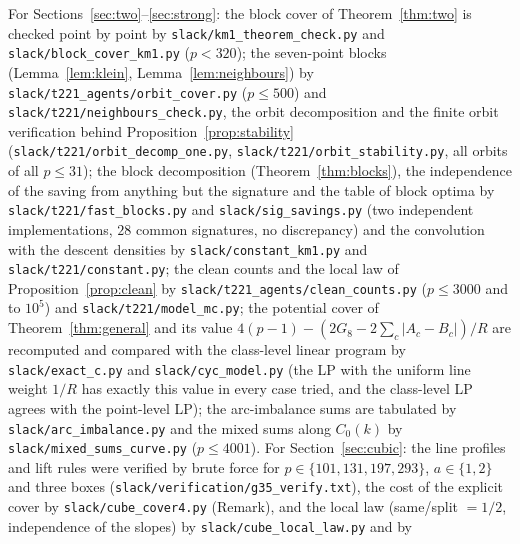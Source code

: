 \documentclass[11pt]{article}
\theoremstyle{remark}
\begin{document}
For Sections~\ref{sec:two}--\ref{sec:strong}: the block cover of Theorem~\ref{thm:two} is checked point by point by
\texttt{slack/\allowbreak km1\_\allowbreak theorem\_\allowbreak check.py} and \texttt{slack/\allowbreak block\_\allowbreak cover\_\allowbreak km1.py} ($p<320$); the seven-point blocks (Lemma~\ref{lem:klein}, Lemma~\ref{lem:neighbours}) by \texttt{slack/\allowbreak t221\_\allowbreak agents/\allowbreak orbit\_\allowbreak cover.py} ($p\le500$) and
\texttt{slack/\allowbreak t221/\allowbreak neighbours\_\allowbreak check.py}, the orbit decomposition and the finite orbit verification behind Proposition~\ref{prop:stability}
(\texttt{slack/\allowbreak t221/\allowbreak orbit\_\allowbreak decomp\_\allowbreak one.py}, \texttt{slack/\allowbreak t221/\allowbreak orbit\_\allowbreak stability.py}, all orbits of all $p\le31$);
the block decomposition (Theorem~\ref{thm:blocks}), the independence of the saving from anything but the signature and the table of block
optima by \texttt{slack/\allowbreak t221/\allowbreak fast\_\allowbreak blocks.py} and \texttt{slack/\allowbreak sig\_\allowbreak savings.py}
(two independent implementations, $28$ common signatures, no discrepancy) and the convolution with the descent densities by
\texttt{slack/\allowbreak constant\_\allowbreak km1.py} and \texttt{slack/\allowbreak t221/\allowbreak constant.py};
the clean counts and the local law of Proposition~\ref{prop:clean} by
\texttt{slack/\allowbreak t221\_\allowbreak agents/\allowbreak clean\_\allowbreak counts.py} ($p\le3000$ and to $10^5$) and \texttt{slack/\allowbreak t221/\allowbreak model\_\allowbreak mc.py};
the potential cover of Theorem~\ref{thm:general} and its value
$4(p-1)-(2G_8-2\sum_c|A_c-B_c|)/R$ are recomputed and compared with the class-level linear program by \texttt{slack/\allowbreak exact\_\allowbreak c.py} and
\texttt{slack/\allowbreak cyc\_\allowbreak model.py} (the LP with the uniform line weight $1/R$ has exactly this value in every case tried, and the class-level LP agrees with
the point-level LP); the arc-imbalance sums are tabulated by \texttt{slack/\allowbreak arc\_\allowbreak imbalance.py} and the mixed sums along $C_0(k)$ by
\texttt{slack/\allowbreak mixed\_\allowbreak sums\_\allowbreak curve.py} ($p\le4001$).  For Section~\ref{sec:cubic}: the line profiles and lift rules were verified by brute force for
$p\in\{101,131,197,293\}$, $a\in\{1,2\}$ and three boxes (\texttt{slack/\allowbreak verification/\allowbreak g35\_\allowbreak verify.txt}), the cost of the explicit cover by
\texttt{slack/\allowbreak cube\_\allowbreak cover4.py} (Remark), and the local law (same/split $=1/2$, independence of the slopes) by \texttt{slack/\allowbreak cube\_\allowbreak local\_\allowbreak law.py} and by
\end{document}
